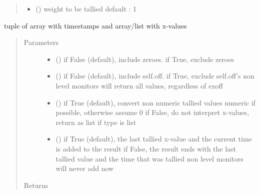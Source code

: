\documentclass[letterpaper,10pt,english]{sphinxmanual}
\begin{document}
\begin{fulllineitems}
\begin{fulllineitems}
\begin{quote}
\begin{description}
\begin{itemize}
\item {} 
 () \textendash{} weight to be tallied 
default : 1 

\end{itemize}

\end{description}\end{quote}

\end{fulllineitems}


\begin{fulllineitems}
\label{\detokenize{Reference:salabim.Monitor.tx}}
tuple of array with timestamps and array/list with x-values
\begin{quote}\begin{description}
\item[{Parameters}] \leavevmode\begin{itemize}
\item {} 
 () \textendash{} if False (default), include zeroes. if True, exclude zeroes

\item {} 
 () \textendash{} if False (default), include self.off. if True, exclude self.off’s 
non level monitors will return all values, regardless of exoff

\item {} 
 () \textendash{} if True (default), convert non numeric tallied values numeric if possible, otherwise assume 0 
if False, do not interpret x-values, return as list if type is list

\item {} 
 () \textendash{} if True (default), the last tallied x-value and the current time is added to the result 
if False, the result ends with the last tallied value and the time that was tallied 
non level monitors will never add now

\end{itemize}

\item[{Returns}] \leavevmode
{}


\end{description}
\end{quote}
\end{fulllineitems}
\end{fulllineitems}
\end{document}
